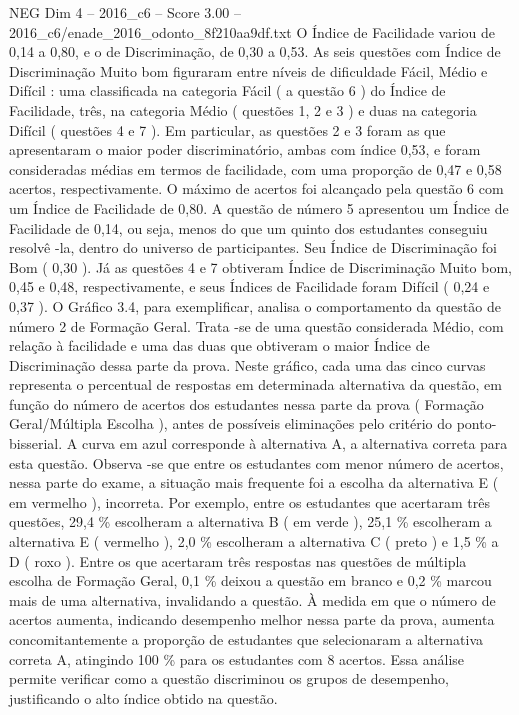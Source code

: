 \begin{textsample}{NEG Dim 4 – 2016\_c6 – Score 3.00 – 2016\_c6/enade\_2016\_odonto\_8f210aa9df.txt}
O Índice de Facilidade variou de 0,14 a 0,80, e o de Discriminação, de 0,30 a 0,53.
As seis questões com Índice de Discriminação Muito bom figuraram entre níveis de dificuldade Fácil, Médio e Difícil : uma classificada na categoria Fácil ( a questão 6 ) do Índice de Facilidade, três, na categoria Médio ( questões 1, 2 e 3 ) e duas na categoria Difícil ( questões 4 e 7 ).
Em particular, as questões 2 e 3 foram as que apresentaram o maior poder discriminatório, ambas com índice 0,53, e foram consideradas médias em termos de facilidade, com uma proporção de 0,47 e 0,58 acertos, respectivamente.
O máximo de acertos foi alcançado pela questão 6 com um Índice de Facilidade de 0,80.
A questão de número 5 apresentou um Índice de Facilidade de 0,14, ou seja, menos do que um quinto dos estudantes conseguiu resolvê -la, dentro do universo de participantes.
Seu Índice de Discriminação foi Bom ( 0,30 ).
Já as questões 4 e 7 obtiveram Índice de Discriminação Muito bom, 0,45 e 0,48, respectivamente, e seus Índices de Facilidade foram Difícil ( 0,24 e 0,37 ).
O Gráfico 3.4, para exemplificar, analisa o comportamento da questão de número 2 de Formação Geral.
Trata -se de uma questão considerada Médio, com relação à facilidade e uma das duas que obtiveram o maior Índice de Discriminação dessa parte da prova.
Neste gráfico, cada uma das cinco curvas representa o percentual de respostas em determinada alternativa da questão, em função do número de acertos dos estudantes nessa parte da prova ( Formação Geral/Múltipla Escolha ), antes de possíveis eliminações pelo critério do ponto-bisserial.
A curva em azul corresponde à alternativa A, a alternativa correta para esta questão.
Observa -se que entre os estudantes com menor número de acertos, nessa parte do exame, a situação mais frequente foi a escolha da alternativa E ( em vermelho ), incorreta.
Por exemplo, entre os estudantes que acertaram três questões, 29,4 \% escolheram a alternativa B ( em verde ), 25,1 \% escolheram a alternativa E ( vermelho ), 2,0 \% escolheram a alternativa C ( preto ) e 1,5 \% a D ( roxo ).
Entre os que acertaram três respostas nas questões de múltipla escolha de Formação Geral, 0,1 \% deixou a questão em branco e 0,2 \% marcou mais de uma alternativa, invalidando a questão.
À medida em que o número de acertos aumenta, indicando desempenho melhor nessa parte da prova, aumenta concomitantemente a proporção de estudantes que selecionaram a alternativa correta A, atingindo 100 \% para os estudantes com 8 acertos.
Essa análise permite verificar como a questão discriminou os grupos de desempenho, justificando o alto índice obtido na questão.

\end{textsample}

